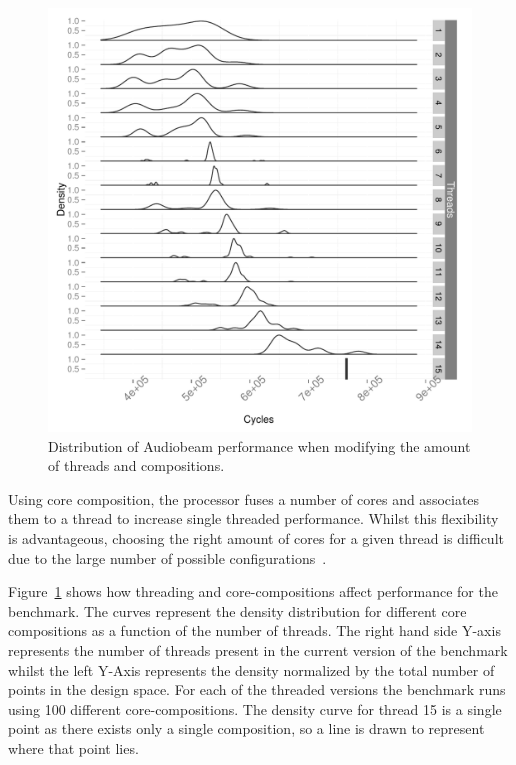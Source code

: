 \begin{figure}[h]
  \includegraphics[width=1\textwidth]{streamit-paper/graphics/audiobeam_tots.pdf}
  \caption{Distribution of Audiobeam performance when modifying the amount of threads and compositions.}\label{fig:audiototal}
\end{figure}

Using core composition, the processor fuses a number of cores and associates them to a thread to increase single threaded performance.
Whilst this flexibility is advantageous, choosing the right amount of cores for a given thread is difficult due to the large number of possible configurations~\cite{gulati2008multitaskingdmc}.

Figure~\ref{fig:audiototal} shows how threading and core-compositions affect performance for the  benchmark.
The curves represent the density distribution for different core compositions as a function of the number of threads.
The right hand side Y-axis represents the number of threads present in the current version of the benchmark whilst the left Y-Axis represents the density normalized by the total number of points in the design space.
For each of the threaded versions the benchmark runs using 100 different core-compositions.
The density curve for thread 15 is a single point as there exists only a single composition, so a line is drawn to represent where that point lies.

